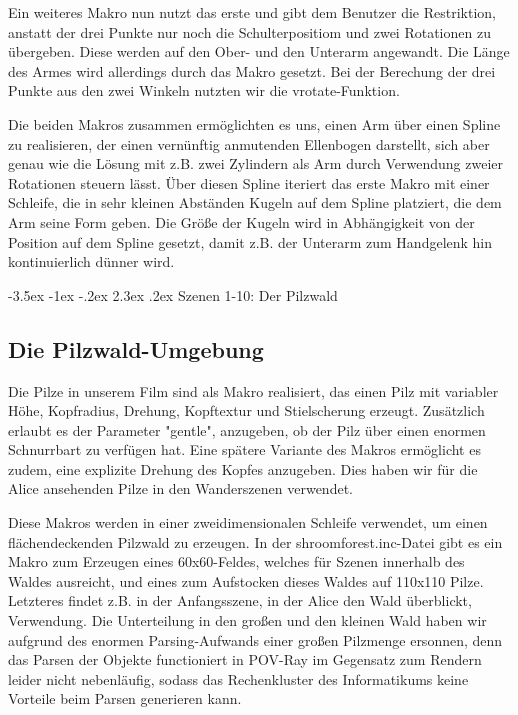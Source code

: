 \documentclass[twocolumn]{article}
\makeatletter
\renewcommand\section{\@startsection{section}{1}{\z@}%
                                      {-3.5ex \@plus -1ex \@minus -.2ex}%
                                      {2.3ex \@plus.2ex}%
                                      {\normalfont\large\bfseries}}
\makeatother
\begin{document}
Ein weiteres Makro nun nutzt das erste und gibt dem Benutzer die Restriktion, anstatt der drei Punkte nur noch die Schulterpositiom und zwei Rotationen zu übergeben.
Diese werden auf den Ober- und den Unterarm angewandt. Die Länge des Armes wird allerdings durch das Makro gesetzt.
Bei der Berechung der drei Punkte aus den zwei Winkeln nutzten wir die vrotate-Funktion.

Die beiden Makros zusammen ermöglichten es uns, einen Arm über einen Spline zu realisieren, der einen vernünftig anmutenden Ellenbogen darstellt, sich aber genau wie die Lösung mit z.B. zwei Zylindern als Arm durch Verwendung zweier Rotationen steuern lässt.
Über diesen Spline iteriert das erste Makro mit einer Schleife, die in sehr kleinen Abständen Kugeln auf dem Spline platziert, die dem Arm seine Form geben.
Die Größe der Kugeln wird in Abhängigkeit von der Position auf dem Spline gesetzt, damit z.B. der Unterarm zum Handgelenk hin kontinuierlich dünner wird.

\section{Szenen 1-10: Der Pilzwald}
\subsection{Die Pilzwald-Umgebung}
Die Pilze in unserem Film sind als Makro realisiert, das einen Pilz mit variabler Höhe, Kopfradius, Drehung, Kopftextur und Stielscherung erzeugt. Zusätzlich erlaubt es der Parameter "gentle", anzugeben, ob der Pilz über einen enormen Schnurrbart zu verfügen hat.
Eine spätere Variante des Makros ermöglicht es zudem, eine explizite Drehung des Kopfes anzugeben. Dies haben wir für die Alice ansehenden Pilze in den Wanderszenen verwendet.

Diese Makros werden in einer zweidimensionalen Schleife verwendet, um einen flächendeckenden Pilzwald zu erzeugen.
In der shroomforest.inc-Datei gibt es ein Makro zum Erzeugen eines 60x60-Feldes, welches für Szenen innerhalb des Waldes ausreicht, und eines zum Aufstocken dieses Waldes auf 110x110 Pilze. Letzteres findet z.B. in der Anfangsszene, in der Alice den Wald überblickt, Verwendung.
Die Unterteilung in den großen und den kleinen Wald haben wir aufgrund des enormen Parsing-Aufwands einer großen Pilzmenge ersonnen, denn das Parsen der Objekte functioniert in POV-Ray im Gegensatz zum Rendern leider nicht nebenläufig, sodass das Rechenkluster des Informatikums keine Vorteile beim Parsen generieren kann.
\end{document}
